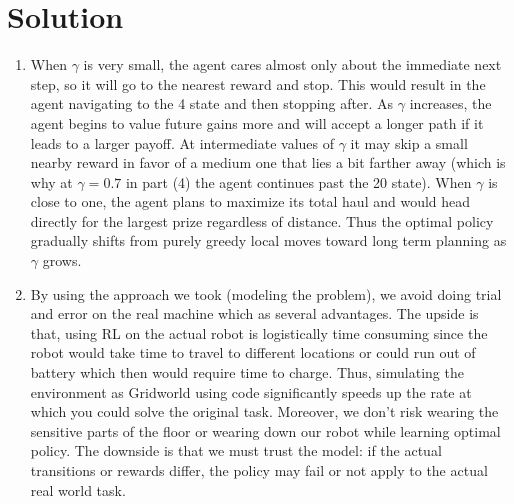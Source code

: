 \documentclass[submit]{../harvardml}
\newenvironment{solution}
  {\color{blue}\section*{Solution}}
{}
\begin{document}
\begin{solution}
\begin{enumerate}
\begin{figure}[htbp]
{              }\hfill
            \end{figure}

        \item  When $\gamma$ is very small, the agent cares almost only about the immediate next step, so it will go to the nearest reward and stop. This would result in the agent navigating to the 4 state and then stopping after. As $\gamma$ increases, the agent begins to value future gains more and will accept a longer path if it leads to a larger payoff. At intermediate values of $\gamma$ it may skip a small nearby reward in favor of a medium one that lies a bit farther away  (which is why at $\gamma = 0.7$ in part (4) the agent continues past the 20 state). When $\gamma$ is close to one, the agent plans to maximize its total haul and would head directly for the largest prize regardless of distance. Thus the optimal policy gradually shifts from purely greedy local moves toward long term planning as $\gamma$ grows.

        \item By using the approach we took (modeling the problem), we avoid doing trial and error on the real machine which as several advantages. The upside is that, using RL on the actual robot is logistically time consuming since the robot would take time to travel to different locations or could run out of battery which then would require time to charge. Thus, simulating the environment as Gridworld using code significantly speeds up the rate at which you could solve the original task. Moreover, we don't risk wearing the sensitive parts of the floor or wearing down our robot while learning optimal policy. The downside is that we must trust the model: if the actual transitions or rewards differ, the policy may fail or not apply to the actual real world task.


\end{enumerate}
\end{solution}
\end{document}
